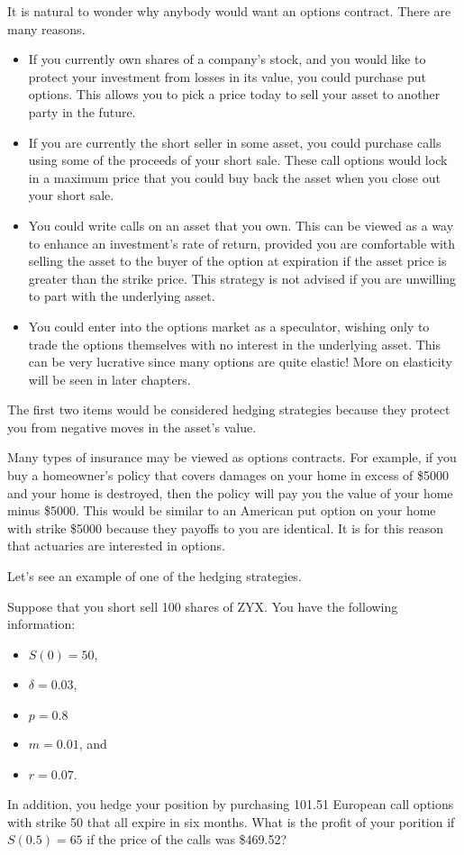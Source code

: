 \documentclass{ximera}
\begin{document}
It is natural to wonder why anybody would want an options contract. There are many reasons. 
\begin{itemize}
\item If you currently own shares of a company's stock, and you would like to protect your investment from losses in its value, you could purchase put options. This allows you to pick a price today to sell your asset to another party in the future. 
\item If you are currently the short seller in some asset, you could purchase calls using some of the proceeds of your short sale. These call options would lock in a maximum price that you could buy back the asset when you close out your short sale.
\item You could write calls on an asset that you own. This can be viewed as a way to enhance an investment's rate of return, provided you are comfortable with selling the asset to the buyer of the option at expiration if the asset price is greater than the strike price. This strategy is not advised if you are unwilling to part with the underlying asset.
\item You could enter into the options market as a speculator, wishing only to trade the options themselves with no interest in the underlying asset. This can be very lucrative since many options are quite elastic! More on elasticity will be seen in later chapters.
\end{itemize}

The first two items would be considered hedging strategies because they protect you from negative moves in the asset's value.

\begin{remark}
Many types of insurance may be viewed as options contracts. For example, if you buy a homeowner's policy that covers damages on your home in excess of \$5000 and your home is destroyed, then the policy will pay you the value of your home minus \$5000. This would be similar to an American put option on your home with strike \$5000 because they payoffs to you are identical. It is for this reason that actuaries are interested in options.
\end{remark}

Let's see an example of one of the hedging strategies.

\begin{example}
Suppose that you short sell 100 shares of ZYX. You have the following information:
	\begin{itemize}
	\item $S(0)=50$,
	\item $\delta=0.03$,
	\item $p=0.8$
	\item $m=0.01$, and
	\item $r=0.07$.
	\end{itemize}
In addition, you hedge your position by purchasing 101.51 European call options with strike 50 that all expire in six months. What is the profit of your porition if $S(0.5)=65$ if the price of the calls was \$469.52?
\end{example}
\end{document}
